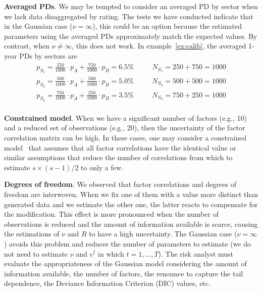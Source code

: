 \documentclass[11pt,fleqn]{book} %
\begin{document}
\textbf{Averaged PDs}. We may be tempted to consider an averaged PD by sector 
when we lack data disaggregated by rating. The tests we have conducted 
indicate that in the Gaussian case ($\nu = \infty$), this could be an option 
because the estimated parameters using the averaged PDs approximately match 
the expected values. By contrast, when $\nu \ne \infty$, this does not work. 
In example~\ref{ex:calib}, the averaged 1-year PDs by sectors are
\begin{displaymath}
	\begin{array}{lll}
		p_{S_1} = \frac{250}{1000} \cdot p_A + \frac{750}{1000} \cdot p_B = 6.5\% & \quad & N_{S_1} = 250 + 750 = 1000 \\
		p_{S_2} = \frac{500}{1000} \cdot p_A + \frac{500}{1000} \cdot p_B = 5.0\% & \quad & N_{S_2} = 500 + 500 = 1000 \\
		p_{S_3} = \frac{750}{1000} \cdot p_A + \frac{250}{1000} \cdot p_B = 3.5\% & \quad & N_{S_3} = 750 + 250 = 1000 \\
	\end{array}
\end{displaymath}

\textbf{Constrained model}. When we have a significant number of factors 
(e.g., 10) and a reduced set of observations (e.g., 20), then the uncertainty 
of the factor correlation matrix can be high. In these cases, one may consider 
a constrained model~\cite{roncalli:2004} that assumes that all factor 
correlations have the identical value or similar assumptions that reduce the 
number of correlations from which to estimate $s{\times}(s-1)/2$ to only a 
few.

\textbf{Degrees of freedom}. We observed that factor correlations and degrees 
of freedom are interwoven. When we fix one of them with a value more distinct 
than generated data and we estimate the other one, the latter reacts to 
compensate for the modification. This effect is more pronounced when the 
number of observations is reduced and the amount of 
information available is scarce, causing the estimations of $\nu$ and $R$
to have a high uncertainty. The Gaussian case ($\nu = \infty$) avoids this 
problem and reduces the number of parameters to estimate (we do not need to 
estimate $\nu$ and $\upsilon^t$ in which $t=1,\dots,T$). 
The risk analyst must evaluate the appropriateness of the Gaussian model 
considering the amount of information available, the number of factors, 
the renounce to capture the tail dependence, the Deviance Information 
Criterion (DIC) values, etc.
\end{document}
